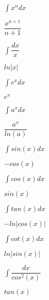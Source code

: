 \documentclass[a8paper,14pt,grid=none%
,print			%
]{kartei}
\begin{document}
	\setcardpagelayout
	
  	
	\begin{karte}{$ \int x^n dx $}
	  	\begin{center}
	  		$ \dfrac{x^{n+1}}{n+1} $
	  	\end{center}
	\end{karte}

	\begin{karte}{$ \int \dfrac{dx}{x} $}
		\begin{center}
			$ ln|x| $
		\end{center}
	\end{karte}

	\begin{karte}{$ \int e^x dx $}
		\begin{center}
			$ e^x $
		\end{center}
	\end{karte}

	\begin{karte}{$ \int a^x dx $}
		\begin{center}
			$ \dfrac{a^x}{ln(a)} $
		\end{center}
	\end{karte}
	
	\begin{karte}{$ \int sin(x) dx $}
		\begin{center}
			$ -cos(x) $
		\end{center}
	\end{karte}

	\begin{karte}{$ \int cos(x) dx $}
		\begin{center}
			$ sin(x) $
		\end{center}
	\end{karte}

	\begin{karte}{$ \int tan(x) dx $}
		\begin{center}
			$ -ln|cos(x)| $
		\end{center}
	\end{karte}

	\begin{karte}{$ \int cot(x) dx $}
		\begin{center}
			$ ln|sin(x)| $
		\end{center}
	\end{karte}

	\begin{karte}{$ \int \dfrac{dx}{cos^2(x)} $}
		\begin{center}
			$ tan(x) $
		\end{center}
	\end{karte}
\end{document}
